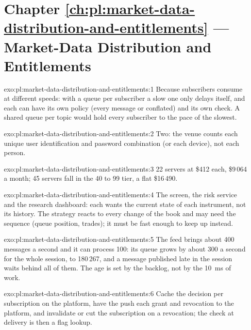 \section*{Chapter \ref{ch:pl:market-data-distribution-and-entitlements} --- Market-Data Distribution and Entitlements}

\begin{solution}{exo:pl:market-data-distribution-and-entitlements:1}
Because subscribers consume at different speeds: with a queue per subscriber a slow one only delays itself, and each can have its own policy
(every message or conflated) and its own  check. A shared queue per topic would hold every subscriber to the pace of the slowest.
\end{solution}

\begin{solution}{exo:pl:market-data-distribution-and-entitlements:2}
Two: the venue counts each unique user identification and password combination (or each device), not each person.
\end{solution}

\begin{solution}{exo:pl:market-data-distribution-and-entitlements:3}
22 servers at \$412 each, \$9\,064 a month; 45 servers fall in the 40 to 99 tier, a flat \$16\,490.
\end{solution}

\begin{solution}{exo:pl:market-data-distribution-and-entitlements:4}
The screen, the risk service and the research dashboard: each wants the current state of each instrument, not its history. The strategy
reacts to every change of the book and may need the sequence (queue position, trades); it must be fast enough to keep up instead.
\end{solution}

\begin{solution}{exo:pl:market-data-distribution-and-entitlements:5}
The feed brings about 400 messages a second and it can process 100: its queue grows by about 300 a second for the whole session, to 180\,267,
and a message published late in the session waits behind all of them. The age is set by the backlog, not by the 10~ms of work.
\end{solution}

\begin{solution}{exo:pl:market-data-distribution-and-entitlements:6}
Cache the  decision per subscription on the platform, have the  push each grant and revocation to the platform,
and invalidate or cut the subscription on a revocation; the check at delivery is then a flag lookup.
\end{solution}

